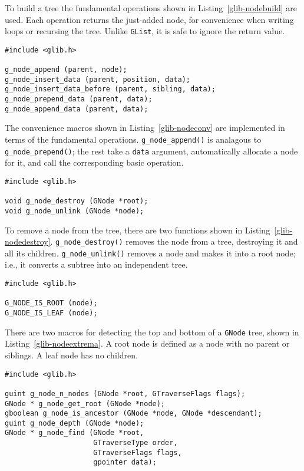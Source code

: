 To build a tree the fundamental operations shown in Listing~\ref{glib-nodebuild} are used. Each operation returns the just-added node, for convenience when writing loops or recursing the tree. Unlike \lstinline{GList}, it is safe to ignore the return value.

\begin{lstlisting}[float, caption={Building a \lstinline{GNode}}, label=glib-nodeconv]
#include <glib.h>

g_node_append (parent, node);
g_node_insert_data (parent, position, data);
g_node_insert_data_before (parent, sibling, data);
g_node_prepend_data (parent, data);
g_node_append_data (parent, data);
\end{lstlisting}

The convenience macros shown in Listing~\ref{glib-nodeconv} are implemented in terms of the fundamental operations. \lstinline{g_node_append()} is analagous to \lstinline{g_node_prepend()}; the rest take a \lstinline{data} argument, automatically allocate a node for it, and call the corresponding basic operation.

\begin{lstlisting}[float, caption={Destroying a \lstinline{GNode}}, label=glib-nodedestroy]
#include <glib.h>

void g_node_destroy (GNode *root);
void g_node_unlink (GNode *node);
\end{lstlisting}

To remove a node from the tree, there are two functions shown in Listing~\ref{glib-nodedestroy}. \lstinline{g_node_destroy()} removes the node from a tree, destroying it and all its children. \lstinline{g_node_unlink()} removes a node and makes it into a root node; i.e., it converts a subtree into an independent tree.

\begin{lstlisting}[float, caption={Predicates for \lstinline{GNode}}, label=glib-nodeextrema]
#include <glib.h>

G_NODE_IS_ROOT (node);
G_NODE_IS_LEAF (node);
\end{lstlisting}

There are two macros for detecting the top and bottom of a \lstinline{GNode} tree, shown in Listing~\ref{glib-nodeextrema}. A root node is defined as a node with no parent or siblings. A leaf node has no children.

\begin{lstlisting}[float, caption={\lstinline{GNode} properties}, label=glib-nodeproperties]
#include <glib.h>

guint g_node_n_nodes (GNode *root, GTraverseFlags flags);
GNode * g_node_get_root (GNode *node);
gboolean g_node_is_ancestor (GNode *node, GNode *descendant);
guint g_node_depth (GNode *node);
GNode * g_node_find (GNode *root,
                     GTraverseType order,
                     GTraverseFlags flags,
                     gpointer data);
\end{lstlisting}

